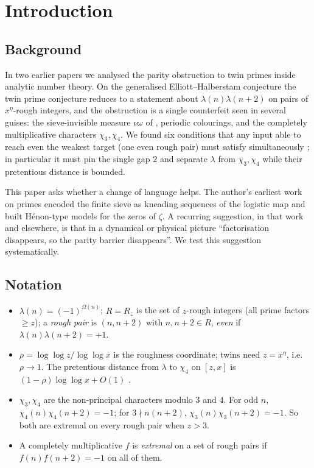 \documentclass[11pt]{amsart}
\theoremstyle{definition}
\theoremstyle{remark}
\begin{document}
\tableofcontents

\section{Introduction}

\subsection{Background}
In two earlier papers \cite{Wan26b,Wan26c} we analysed the parity obstruction to twin primes inside analytic number theory. On the generalised Elliott--Halberstam conjecture the twin prime conjecture reduces to a statement about $\lambda(n)\lambda(n+2)$ on pairs of $x^\eta$-rough integers, and the obstruction is a single counterfeit seen in several guises: the sieve-invisible measure $\nu\omega$ of \cite[\S8]{Polymath8b}, periodic colourings, and the completely multiplicative characters $\chi_3,\chi_4$. We found six conditions that any input able to reach even the weakest target (one even rough pair) must satisfy simultaneously \cite[\S8]{Wan26c}; in particular it must pin the single gap $2$ and separate $\lambda$ from $\chi_3,\chi_4$ while their pretentious distance is bounded.

This paper asks whether a change of language helps. The author's earliest work on primes encoded the finite sieve as kneading sequences of the logistic map and built Hénon-type models for the zeros of $\zeta$. A recurring suggestion, in that work and elsewhere, is that in a dynamical or physical picture ``factorisation disappears, so the parity barrier disappears''. We test this suggestion systematically.

\subsection{Notation}
\begin{itemize}
\item $\lambda(n)=(-1)^{\Omega(n)}$; $R=R_z$ is the set of $z$-rough integers (all prime factors $\ge z$); a \emph{rough pair} is $(n,n+2)$ with $n,n+2\in R$, \emph{even} if $\lambda(n)\lambda(n+2)=+1$.
\item $\rho=\log\log z/\log\log x$ is the roughness coordinate; twins need $z=x^\eta$, i.e.\ $\rho\to1$. The pretentious distance from $\lambda$ to $\chi_4$ on $[z,x]$ is $(1-\rho)\log\log x+O(1)$ \cite{Wan26c}.
\item $\chi_3,\chi_4$ are the non-principal characters modulo $3$ and $4$. For odd $n$, $\chi_4(n)\chi_4(n+2)=-1$; for $3\nmid n(n+2)$, $\chi_3(n)\chi_3(n+2)=-1$. So both are extremal on every rough pair when $z>3$.
\item A completely multiplicative $f$ is \emph{extremal} on a set of rough pairs if $f(n)f(n+2)=-1$ on all of them.
\end{itemize}
\end{document}
